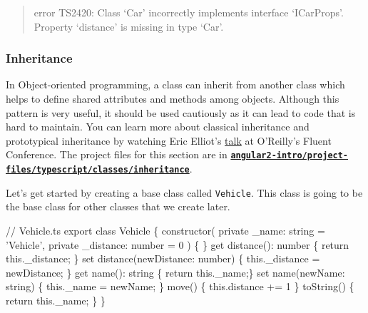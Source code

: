 \documentclass[12pt,]{article}
\newenvironment{Shaded}{}{}
\newcommand{\KeywordTok}[1]{\textcolor[rgb]{0.00,0.00,1.00}{{#1}}}
\newcommand{\DecValTok}[1]{{#1}}
\newcommand{\CommentTok}[1]{\textcolor[rgb]{0.00,0.50,0.00}{{#1}}}
\newcommand{\FunctionTok}[1]{{#1}}
\newcommand{\NormalTok}[1]{{#1}}
\begin{document}
\begin{quote}
error TS2420: Class `Car' incorrectly implements interface `ICarProps'.
Property `distance' is missing in type `Car'.
\end{quote}

\subsubsection{Inheritance}\label{inheritance}

In Object-oriented programming, a class can inherit from another class
which helps to define shared attributes and methods among objects.
Although this pattern is very useful, it should be used cautiously as it
can lead to code that is hard to maintain. You can learn more about
classical inheritance and prototypical inheritance by watching Eric
Elliot's \href{https://www.youtube.com/watch?v=lKCCZTUx0sI}{talk} at
O'Reilly's Fluent Conference. The project files for this section are in
\href{https://github.com/st32lth/angular2-intro/tree/master/project-files/typescript/classes/inheritance}{\textbf{\texttt{angular2-intro/project-files/typescript/classes/inheritance}}}.

Let's get started by creating a base class called \texttt{Vehicle}. This
class is going to be the base class for other classes that we create
later.

\begin{Shaded}
\begin{Highlighting}[numbers=left,,]
\CommentTok{// Vehicle.ts}
\NormalTok{export }\KeywordTok{class} \NormalTok{Vehicle \{}
  \FunctionTok{constructor}\NormalTok{( }\KeywordTok{private} \NormalTok{_name: string = 'Vehicle',}
               \KeywordTok{private} \NormalTok{_distance: number = }\DecValTok{0} \NormalTok{) \{ \}}
  \NormalTok{get }\FunctionTok{distance}\NormalTok{(): number \{ }\KeywordTok{return} \KeywordTok{this}\NormalTok{.}\FunctionTok{_distance}\NormalTok{; \}}
  \NormalTok{set }\FunctionTok{distance}\NormalTok{(newDistance: number) \{ }\KeywordTok{this}\NormalTok{.}\FunctionTok{_distance} \NormalTok{= newDistance; \}}
  \NormalTok{get }\FunctionTok{name}\NormalTok{(): string \{ }\KeywordTok{return} \KeywordTok{this}\NormalTok{.}\FunctionTok{_name}\NormalTok{;\}}
  \NormalTok{set }\FunctionTok{name}\NormalTok{(newName: string) \{ }\KeywordTok{this}\NormalTok{.}\FunctionTok{_name} \NormalTok{= newName; \}}
  \FunctionTok{move}\NormalTok{() \{ }\KeywordTok{this}\NormalTok{.}\FunctionTok{distance} \NormalTok{+= }\DecValTok{1} \NormalTok{\}}
  \FunctionTok{toString}\NormalTok{() \{ }\KeywordTok{return} \KeywordTok{this}\NormalTok{.}\FunctionTok{_name}\NormalTok{; \}}
\NormalTok{\}}
\end{Highlighting}
\end{Shaded}
\end{document}

